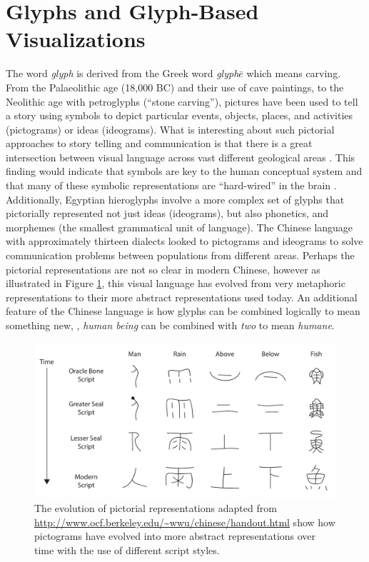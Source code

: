 \section{Glyphs and Glyph-Based Visualizations}
\label{sec:relwork_glyphs}
The word \emph{glyph} is derived from the Greek word \emph{glyph$\bar{e}$} which means carving.
From the Palaeolithic age (18,000 BC) and their use of cave paintings, to the Neolithic age with petroglyphs (``stone carving''), pictures have been used to tell a story using symbols to depict particular events, objects, places, and activities (pictograms) or ideas (ideograms).
What is interesting about such pictorial approaches to story telling and communication is that there is a great intersection between visual language across vast different geological areas \cite{Eliade1991}.
This finding would indicate that symbols are key to the human conceptual system and that many of these symbolic representations are ``hard-wired'' in the brain \cite{Borgo:2013:EG,Eliade1991}.
Additionally, Egyptian hieroglyphs involve a more complex set of glyphs that pictorially represented not just ideas (ideograms), but also phonetics, and morphemes (the smallest grammatical unit of language).
The Chinese language with approximately thirteen dialects looked to pictograms and ideograms to solve communication problems between populations from different areas.
Perhaps the pictorial representations are not so clear in modern Chinese, however as illustrated in Figure \ref{fig:chinese-evolution}, this visual language has evolved from very metaphoric representations to their more abstract representations used today.
An additional feature of the Chinese language is how glyphs can be combined logically to mean something new, \eg, \emph{human being} can be combined with \emph{two} to mean \emph{humane}. 

\begin{figure}[b!]
\centering
\includegraphics[width=.7\textwidth]{images/related-work/glyphs/chinese-pictograms}
\caption{The evolution of pictorial representations adapted from \url{http://www.ocf.berkeley.edu/\~wwu/chinese/handout.html} show how pictograms have evolved into more abstract representations over time with the use of different script styles.}
\label{fig:chinese-evolution}
\end{figure}

